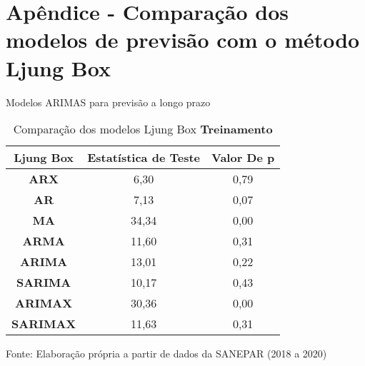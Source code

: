 
\section{Ap\^endice - Compara\c c\~ao dos modelos de previs\~ao com o m\'etodo Ljung Box}\label{sec:comtb18}



Modelos ARIMAS para previsão a longo prazo

	\begin{table}[H]
		\centering
		\caption{Comparação dos modelos Ljung Box \textbf{Treinamento} }\label{tb:lbtrn}
	\begin{tabular}{@{}ccc@{}}
		\toprule
		\textbf{Ljung Box} & \textbf{Estatística de Teste} & \textbf{Valor De p} \\ \midrule
\textbf{ARX}       & 6,30                          & 0,79                \\
\textbf{AR}        & 7,13                          & 0,07                \\
\textbf{MA}        & 34,34                         & 0,00                \\
\textbf{ARMA}      & 11,60                         & 0,31                \\
\textbf{ARIMA}     & 13,01                         & 0,22                \\
\textbf{SARIMA}    & 10,17                         & 0,43                \\
\textbf{ARIMAX}    & 30,36                         & 0,00                \\
\textbf{SARIMAX}   & 11,63                         & 0,31                \\ \bottomrule
	\end{tabular}

Fonte: Elaboração própria a partir de dados da SANEPAR (2018 a 2020)
	\end{table}

